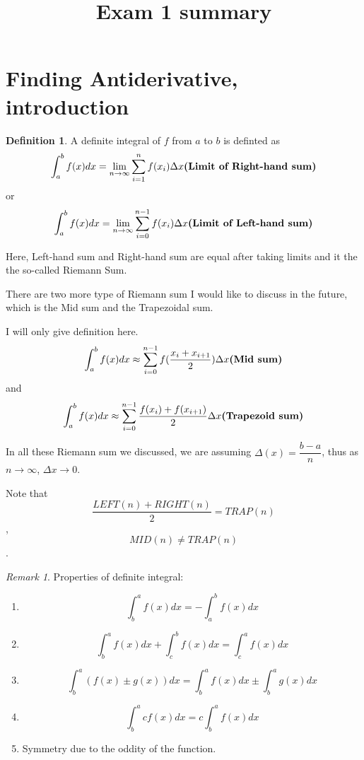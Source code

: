 \documentclass[12pt]{article}
\date{}
\title{Exam 1 summary}
\theoremstyle{definition}
\theoremstyle{definition}
\newtheorem{definition}{Definition}[section]
\theoremstyle{remark}
\newtheorem*{remark}{Remark}
\theoremstyle{definition}
\theoremstyle{definition}
\theoremstyle{definition}
\begin{document}
\maketitle




\section{Finding Antiderivative, introduction}

\begin{definition}
	A definite integral of $f$ from $a$ to $b$ is definted as 
\[\int_a^bf(x)dx= \lim_{n\rightarrow \infty} \sum_{i=1}^n f(x_i)\Delta x\text{\bf (Limit of Right-hand sum)}\]
or 
\[\int_a^bf(x)dx= \lim_{n\rightarrow \infty} \sum_{i=0}^{n-1} f(x_i)\Delta x\text{\bf (Limit of Left-hand sum)}\]

Here, Left-hand sum and Right-hand sum are equal after taking limits and it the the so-called Riemann Sum.
\end{definition}



There are two more type of Riemann sum I would like to discuss in the future, which is the Mid sum and the Trapezoidal sum. 

I will only give definition here.
\[\int_a^bf(x)dx\approx  \sum_{i=0}^{n-1} f(\frac{x_i+x_{i+1}}{2})\Delta x\text{\bf (Mid sum)}\]
and
\[\int_a^bf(x)dx\approx \sum_{i=0}^{n-1} \frac{f(x_i)+f(x_{i+1})}{2}\Delta x\text{\bf (Trapezoid sum)}\]

In all these Riemann sum we discussed, we are assuming $\Delta(x)=\dfrac{b-a}{n}$, thus as $n\to \infty$, $\Delta x \to 0$.

Note that \[\frac{LEFT(n)+RIGHT(n)}{2}=TRAP(n)\], \[MID(n)\neq TRAP(n)\].

\newpage

\begin{remark}
	Properties of definite integral:
	\begin{enumerate}
		\item \[\int^a_b f(x) dx = -\int^b_a f(x) dx\]
		\item \[\int^a_b f(x) dx+\int^b_c f(x) dx=\int^a_c f(x) dx\]
		\item \[\int^a_b (f(x)\pm g(x)) dx=\int^a_b f(x) dx \pm \int^a_b g(x) dx\]
		\item \[\int^a_b cf(x) dx = c \int^a_b f(x) dx\]
		\item Symmetry due to the oddity of the function.
	\end{enumerate}
\end{remark}
\end{document}

